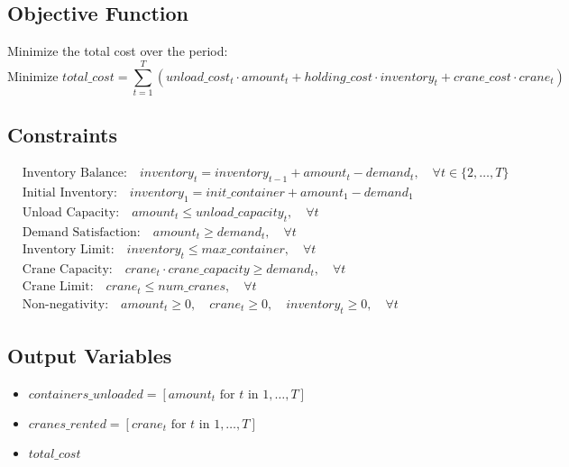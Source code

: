 \documentclass{article}
\begin{document}
\subsection*{Objective Function}
Minimize the total cost over the period:
\[
\text{Minimize } total\_cost = \sum_{t=1}^{T} \left( unload\_cost_t \cdot amount_t + holding\_cost \cdot inventory_t + crane\_cost \cdot crane_t \right)
\]

\subsection*{Constraints}
\begin{align}
    & \text{Inventory Balance:} \quad inventory_t = inventory_{t-1} + amount_t - demand_t, \quad \forall t \in \{2, \ldots, T\} \\
    & \text{Initial Inventory:} \quad inventory_1 = init\_container + amount_1 - demand_1 \\
    & \text{Unload Capacity:} \quad amount_t \leq unload\_capacity_t, \quad \forall t \\
    & \text{Demand Satisfaction:} \quad amount_t \geq demand_t, \quad \forall t \\
    & \text{Inventory Limit:} \quad inventory_t \leq max\_container, \quad \forall t \\
    & \text{Crane Capacity:} \quad crane_t \cdot crane\_capacity \geq demand_t, \quad \forall t \\
    & \text{Crane Limit:} \quad crane_t \leq num\_cranes, \quad \forall t \\
    & \text{Non-negativity:} \quad amount_t \geq 0, \quad crane_t \geq 0, \quad inventory_t \geq 0, \quad \forall t
\end{align}

\subsection*{Output Variables}
\begin{itemize}
    \item $containers\_unloaded = [amount_t \text{ for } t \text{ in } 1, \ldots, T]$
    \item $cranes\_rented = [crane_t \text{ for } t \text{ in } 1, \ldots, T]$
    \item $total\_cost$
\end{itemize}
\end{document}
